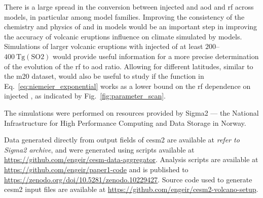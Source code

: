 \documentclass{ametsocV6.1}
\newcommand{\iso}[1][i]{{#1}njected \ce{SO2}}
\begin{document}
There is a large spread in the conversion between \iso{} and \gls{aod} and \gls{rf}
across models, in particular among model families. Improving the consistency of the
chemistry and physics of  and  in models would be an important step in
improving the accuracy of volcanic eruptions influence on climate simulated by models.
Simulations of larger volcanic eruptions with \iso{} of at least
\(200\)--\(\SI{400}{\tera\gram(\mathrm{SO2})}\) would provide useful information for a
more precise determination of the evolution of the \gls{rf} to \gls{aod} ratio. Allowing
for different latitudes, similar to the \gls{m20} dataset, would also be useful to study
if the function in Eq.~\ref{eq:niemeier_exponential} works as a lower bound on the
\gls{rf} dependence on \iso{}, as indicated by Fig.~\ref{fig:parameter_scan}.

\clearpage
\acknowledgments{}

The simulations were performed on resources provided by Sigma2 --- the National
Infrastructure for High Performance Computing and Data Storage in Norway.

%
%
\datastatement{}

Data generated directly from output fields of \gls{cesm2} are available at \emph{refer
  to Sigma2 archive}, and were generated using scripts available at
\url{https://github.com/engeir/cesm-data-aggregator}. Analysis scripts are available at
\url{https://github.com/engeir/paper1-code} and is published to
\url{https://zenodo.org/doi/10.5281/zenodo.10229427}. Source code used to generate
\gls{cesm2} input files are available at
\url{https://github.com/engeir/cesm2-volcano-setup}.
\end{document}
